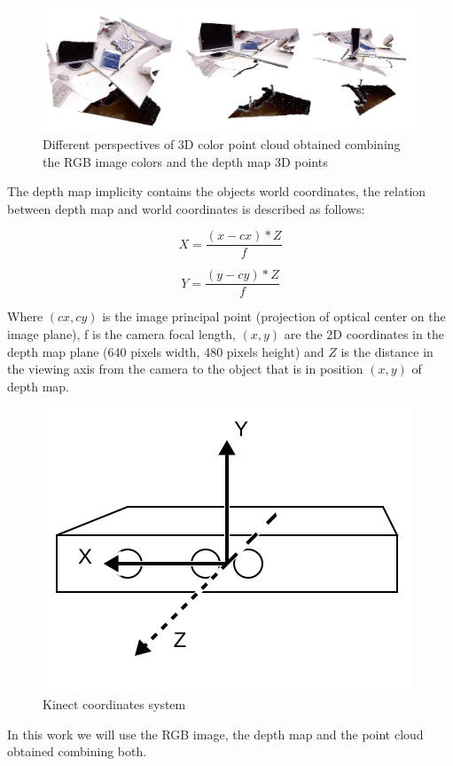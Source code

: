 \begin{figure}[h!]
\begin{center}
\includegraphics[scale=0.25]{images/3d_point_cloud.png}
\caption{Different perspectives of 3D color point cloud obtained combining the RGB image colors and the depth map 3D points}
\label{fig:colorpcloud}
\end{center}
\end{figure}


The depth map implicity contains the objects world coordinates, the relation between depth map 
and world coordinates is described as follows:

\begin{equation}
\label{eq:dasdf}
 X=\frac{(x-cx)*Z}{f}
\end{equation}

\begin{equation}
\label{eq:dispadsfy2}
 Y=\frac{(y-cy)*Z}{f}
\end{equation}


Where $(cx,cy)$ is the image principal point (projection of optical center on the image plane), f is the camera 
focal length, $(x,y)$ are the 2D coordinates in the depth map plane (640 pixels width, 480 pixels height) and $Z$ is the distance in the viewing axis from the camera to the object that is in position $(x,y)$ of depth map.

\begin{figure}[H]
\begin{center}
\includegraphics[scale=0.55]{images/coordinates}
\caption{Kinect coordinates system}
\label{fig:coordinates}
\end{center}
\end{figure}

In this work we will use the RGB image, the depth map and the point cloud obtained combining both.


